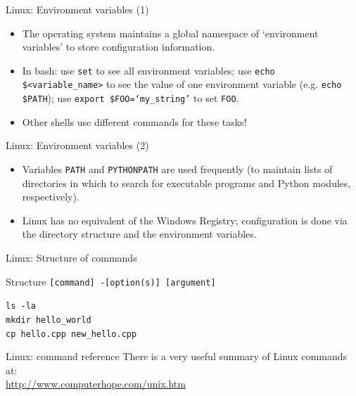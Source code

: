 \documentclass{beamer}
\begin{document}
\begin{frame}{Linux: Environment variables (1)}
  \begin{itemize}
    \item The operating system maintains a global namespace of `environment variables' to store configuration information.
    \item In bash: use  \alert{\texttt{set}} to see all environment variables; use \alert{\texttt{echo \$<variable\_name>}} to see the value of one environment variable (e.g. \alert{\texttt{echo \$PATH}}); use \alert{\texttt{export \$FOO=`my\_string'}} to set \texttt{FOO}.
    \item Other shells use different commands for these tasks!
  \end{itemize}
\end{frame}

\begin{frame}{Linux: Environment variables (2)}
  \begin{itemize}
    \item Variables \texttt{PATH} and \texttt{PYTHONPATH} are used frequently (to maintain lists of directories in which to search for executable programs and Python modules, respectively).
    \item Linux has no equivalent of the Windows Registry; configuration is done via the directory structure and the environment variables.
  \end{itemize}
\end{frame}


\begin{frame}{Linux: Structure of commands}
  \begin{block}{Structure}
    \texttt{[command] -[option(s)] [argument]}
  \end{block}
  \begin{Examples}
     \texttt{ls -la \\
     mkdir hello\_world \\
     cp hello.cpp new\_hello.cpp} \\
  \end{Examples}
\end{frame}

\begin{frame}{Linux: command reference}
There is a very useful summary of Linux commands at: \\
\url{http://www.computerhope.com/unix.htm}
\end{frame}
\end{document}
